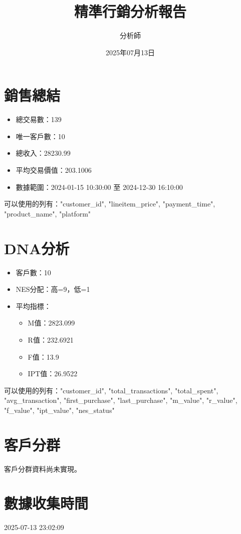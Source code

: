 \documentclass{report}
\begin{document}
\title{精準行銷分析報告}
\author{分析師}
\date{2025年07月13日}

\maketitle
\newpage

\section{銷售總結}
\begin{itemize}
    \item 總交易數：139
    \item 唯一客戶數：10
    \item 總收入：28230.99
    \item 平均交易價值：203.1006
    \item 數據範圍：2024-01-15 10:30:00 至 2024-12-30 16:10:00
\end{itemize}

可以使用的列有："customer\_id", "lineitem\_price", "payment\_time", "product\_name", "platform"

\section{DNA分析}
\begin{itemize}
    \item 客戶數：10
    \item NES分配：高=9，低=1
    \item 平均指標：
    \begin{itemize}
        \item M值：2823.099
        \item R值：232.6921
        \item F值：13.9
        \item IPT值：26.9522
    \end{itemize}
\end{itemize}

可以使用的列有："customer\_id", "total\_transactions", "total\_spent", "avg\_transaction", "first\_purchase", "last\_purchase", "m\_value", "r\_value", "f\_value", "ipt\_value", "nes\_status"

\section{客戶分群}
客戶分群資料尚未實現。

\section{數據收集時間}
2025-07-13 23:02:09
\end{document}
